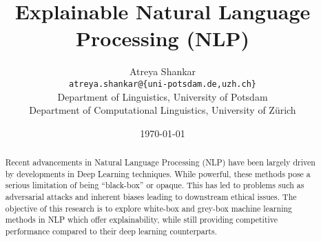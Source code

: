 \documentclass[12pt,a4paper]{article}
\title{Explainable Natural Language Processing (NLP)}
\author{Atreya Shankar\\
\texttt{atreya.shankar@\{uni-potsdam.de,uzh.ch\}} \\
Department of Linguistics, University of Potsdam \\
Department of Computational Linguistics, University of Zürich}
\date{\today}
\begin{document}
\newgeometry{}
\maketitle
\thispagestyle{empty}
\begin{abstract}
  Recent advancements in Natural Language Processing (NLP) have been largely driven by developments in Deep Learning techniques. While powerful, these methods pose a serious limitation of being ``black-box'' or opaque. This has led to problems such as adversarial attacks and inherent biases leading to downstream ethical issues. The objective of this research is to explore white-box and grey-box machine learning methods in NLP which offer explainability, while still providing competitive performance compared to their deep learning counterparts.
\end{abstract}
\tableofcontents
\newpage
\restoregeometry
\setcounter{page}{1}
\thispagestyle{plain}

\newpage
{}


\end{document}
